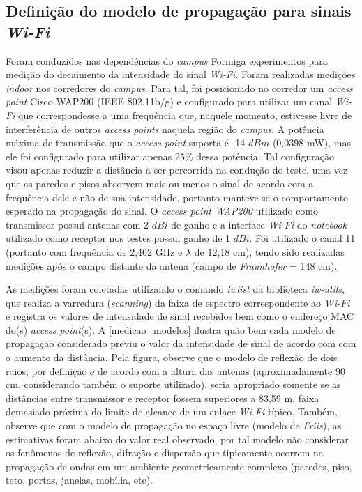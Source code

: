 \documentclass[
	12pt,				%
	twoside,			%
	a4paper,			%
	english,			%
	french,				%
	spanish,			%
	brazil				%
	]{abntex2}
\begin{document}
\subsection{\texorpdfstring{Definição do modelo de propagação para
sinais
\emph{Wi-Fi}}{Definição do modelo de propagação para sinais Wi-Fi}}\label{definiuxe7uxe3o-do-modelo-de-propagauxe7uxe3o-para-sinais-wi-fi}

Foram conduzidos nas dependências do \emph{campus} Formiga experimentos
para medição do decaimento da intensidade do sinal \emph{Wi-Fi}. Foram
realizadas medições \emph{indoor} nos corredores do \emph{campus}. Para
tal, foi posicionado no corredor um \emph{access point} Cisco WAP200
(IEEE 802.11b/g) e configurado para utilizar um canal \emph{Wi-Fi} que
correspondesse a uma frequência que, naquele momento, estivesse livre de
interferência de outros \emph{access points} naquela região do
\emph{campus}. A potência máxima de transmissão que o \emph{access
point} suporta é -14 \(dBm\) (0,0398 mW), mas ele foi configurado para
utilizar apenas \(25\%\) dessa potência. Tal configuração visou apenas
reduzir a distância a ser percorrida na condução do teste, uma vez que
as paredes e pisos absorvem mais ou menos o sinal de acordo com a
frequência dele e não de sua intensidade, portanto manteve-se o
comportamento esperado na propagação do sinal. O \emph{access point
WAP200} utilizado como transmissor possui antenas com 2 \(dBi\) de ganho
e a interface \emph{Wi-Fi} do \emph{notebook} utilizado como receptor
nos testes possui ganho de 1 \(dBi\). Foi utilizado o canal 11 (portanto
com frequência de 2,462 GHz e \(\lambda\) de 12,18 cm), tendo sido
realizadas medições após o campo distante da antena (campo de
\emph{Fraunhofer} = 148 cm).

As medições foram coletadas utilizando o comando \emph{iwlist} da
biblioteca \emph{iw-utils}, que realiza a varredura (\emph{scanning}) da
faixa de espectro correspondente ao \emph{Wi-Fi} e registra os valores
de intensidade de sinal recebidos bem como o endereço MAC do(s)
\emph{access point}(s). A \autoref{medicao_modelos} ilustra quão bem
cada modelo de propagação considerado previu o valor da intensidade de
sinal de acordo com com o aumento da distância. Pela figura, observe que
o modelo de reflexão de dois raios, por definição e de acordo com a
altura das antenas (aproximadamente 90 cm, considerando também o suporte
utilizado), seria apropriado somente se as distâncias entre transmissor
e receptor fossem superiores a 83,59 m, faixa demasiado próxima do
limite de alcance de um enlace \emph{Wi-Fi} típico. Também, observe que
com o modelo de propagação no espaço livre (modelo de \emph{Friis}), as
estimativas foram abaixo do valor real observado, por tal modelo não
considerar os fenômenos de reflexão, difração e dispersão que
tipicamente ocorrem na propagação de ondas em um ambiente
geometricamente complexo (paredes, piso, teto, portas, janelas, mobília,
etc).
\end{document}
